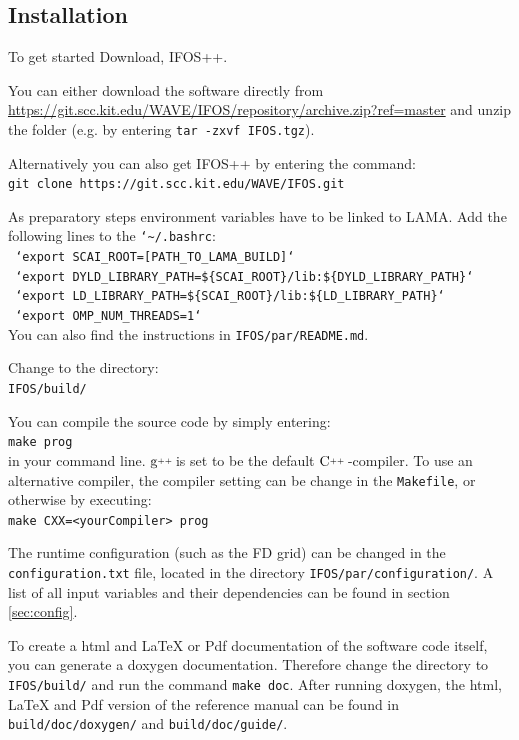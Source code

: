\documentclass[pdftex,a4paper,parskip,listof=totoc,bibliography=totoc,onehalfspacing,12pt]{scrreprt}
\newcommand{\CC}[1][]{$\text{C\hspace{0ex}}^{_{_{_{++}}}}					%
                      \ifthenelse{\equal{#1}{}}{}{\text{\hspace{-.625ex}#1}}$}
\newcommand{\gCC}[1][]{$\text{g\hspace{0ex}}^{_{_{_{++}}}}				%
                      \ifthenelse{\equal{#1}{}}{}{\text{\hspace{-.25ex}(#1)}}$}
\newcommand{\shellcmd}[1]{\indent\indent\texttt{#1}}	%
\newcommand{\shellcmdline}[1]{\indent\indent\texttt{\quad#1}} 	%
\begin{document}
\subsection{Installation}
To get started Download, IFOS++. 

You can either download the software directly from \url{https://git.scc.kit.edu/WAVE/IFOS/repository/archive.zip?ref=master} and unzip the folder (e.g. by entering \shellcmd{tar -zxvf IFOS.tgz}).

Alternatively you can also get IFOS++ by entering the command: \\\shellcmdline{git clone https://git.scc.kit.edu/WAVE/IFOS.git}

As preparatory steps environment variables have to be linked to LAMA. Add the following lines to the \shellcmd{{\char`\~}/.bashrc}:
\\\shellcmdline{ `export SCAI\_ROOT=[PATH\_TO\_LAMA\_BUILD]`}
\\\shellcmdline{ `export DYLD\_LIBRARY\_PATH=\$\{SCAI\_ROOT\}/lib:\$\{DYLD\_LIBRARY\_PATH\}`}
\\\shellcmdline{ `export LD\_LIBRARY\_PATH=\$\{SCAI\_ROOT\}/lib:\$\{LD\_LIBRARY\_PATH\}`}
\\\shellcmdline{ `export OMP\_NUM\_THREADS=1`}\\
You can also find the instructions in \shellcmd{IFOS/par/README.md}. 

Change to the directory: \\\shellcmdline{IFOS/build/}

You can compile the source code by simply entering: \\\shellcmdline{make prog}\\ in your command line. \gCC is set to be the default \CC-compiler. To use an alternative compiler, the compiler setting can be change in the \shellcmd{Makefile}, or otherwise by executing:\\\shellcmdline{make CXX=<yourCompiler> prog}

The runtime configuration (such as the FD grid) can be changed in the \shellcmd{configuration.txt} file, located in the directory \shellcmd{IFOS/par/configuration/}. A list of all input variables and their dependencies can be found in section \ref{sec:config}. 

To create a html and LaTeX or Pdf documentation of the software code itself, you can generate a doxygen documentation. Therefore change the directory to \shellcmd{IFOS/build/} and run the command \shellcmd{make doc}. After running doxygen, the html, LaTeX and Pdf version of the reference manual can be found in \shellcmd{build/doc/doxygen/} and \shellcmd{build/doc/guide/}.
\end{document}
